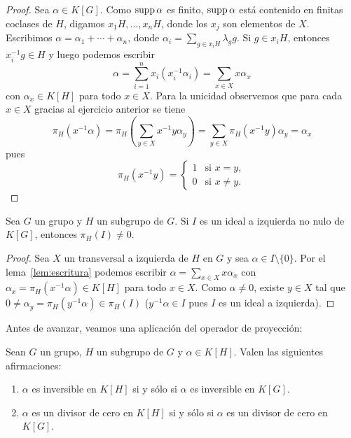 \begin{proof}
	Sea $\alpha\in K[G]$. Como $\operatorname{supp}\alpha$ es finito, $\operatorname{supp}\alpha$ está
	contenido en finitas coclases de $H$, digamos $x_1H,\dots,x_nH$, donde los
	$x_j$ son elementos de $X$. Escribimos $\alpha=\alpha_1+\cdots+\alpha_n$,
	donde $\alpha_i=\sum_{g\in x_iH}\lambda_gg$. Si $g\in x_iH$, entonces
	$x_i^{-1}g\in H$ y luego podemos escribir
	\[
		\alpha=\sum_{i=1}^n x_i(x_i^{-1}\alpha_i)=\sum_{x\in X}x\alpha_x
	\]
	con $\alpha_x\in K[H]$ para todo $x\in X$. Para la unicidad observemos que
	para cada $x\in X$ gracias al ejercicio anterior se tiene 
	\[
		\pi_H(x^{-1}\alpha)
		=\pi_H\left(\sum_{y\in X}x^{-1}y\alpha_y\right)
		=\sum_{y\in X}\pi_H(x^{-1}y)\alpha_y=\alpha_x
	\]
	pues 
	\[
		\pi_H(x^{-1}y)=\begin{cases}
		1 & \text{si $x=y$},\\
		0 & \text{si $x\ne y$}.
	\end{cases}
	\]
\end{proof}


\begin{lemma}
	\label{lem:ideal_pi}
	Sea $G$ un grupo y $H$ un subgrupo de $G$.  Si $I$ es un ideal a izquierda
	no nulo de $K[G]$, entonces $\pi_H(I)\ne 0$.
\end{lemma}

\begin{proof}
	Sea $X$ un transversal a izquierda de $H$ en $G$ y sea $\alpha\in I\setminus\{0\}$. Por
	el lema~\ref{lem:escritura} podemos escribir $\alpha=\sum_{x\in
	X}x\alpha_x$ con $\alpha_x=\pi_H(x^{-1}\alpha)\in K[H]$ para todo $x\in X$.
	Como $\alpha\ne0$, existe $y\in X$ tal que $0\ne
	\alpha_y=\pi_H(y^{-1}\alpha)\in\pi_H(I)$ ($y^{-1}\alpha\in I$ pues $I$ es
	un ideal a izquierda).
\end{proof}

Antes de avanzar, veamos una aplicación del operador de proyección:

\begin{proposition}
	Sean $G$ un grupo, $H$ un subgrupo de $G$ y $\alpha\in K[H]$. Valen las siguientes afirmaciones:
	\begin{enumerate}
		\item $\alpha$ es inversible en $K[H]$ si y sólo si $\alpha$ es
			inversible en $K[G]$.
		\item $\alpha$ es un divisor de cero en $K[H]$ si y sólo si $\alpha$ es
			un divisor de cero en $K[G]$.
	\end{enumerate}
\end{proposition}

